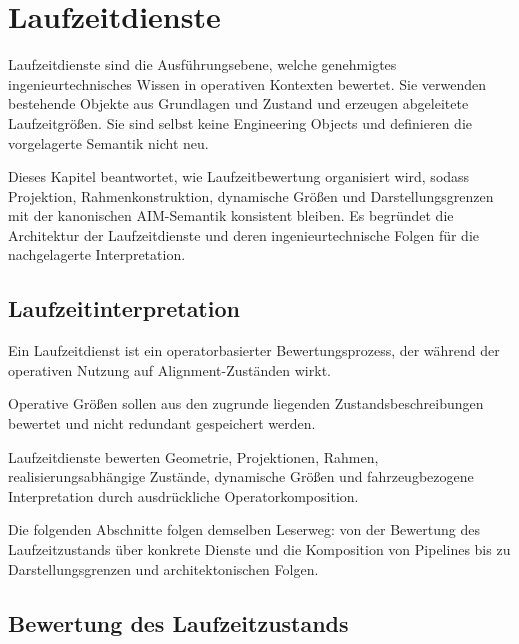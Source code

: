 
\chapter{Laufzeitdienste}
\label{chap:runtime-services}


Laufzeitdienste sind die Ausführungsebene, welche genehmigtes
ingenieurtechnisches Wissen in operativen Kontexten bewertet. Sie verwenden
bestehende Objekte aus Grundlagen und Zustand und erzeugen abgeleitete
Laufzeitgrößen. Sie sind selbst keine Engineering Objects und definieren die
vorgelagerte Semantik nicht neu.

Dieses Kapitel beantwortet, wie Laufzeitbewertung organisiert wird, sodass
Projektion, Rahmenkonstruktion, dynamische Größen und Darstellungsgrenzen mit
der kanonischen AIM-Semantik konsistent bleiben. Es begründet die Architektur
der Laufzeitdienste und deren ingenieurtechnische Folgen für die nachgelagerte
Interpretation.

\section{Laufzeitinterpretation}

\begin{definition}[Laufzeitdienst]
\label{def:runtime-service}
Ein Laufzeitdienst ist ein operatorbasierter Bewertungsprozess, der während
der operativen Nutzung auf Alignment-Zuständen wirkt.
\end{definition}

\begin{principle}
\label{princ:runtime-evaluation}
Operative Größen sollen aus den zugrunde liegenden Zustandsbeschreibungen
bewertet und nicht redundant gespeichert werden.
\end{principle}

Laufzeitdienste bewerten Geometrie, Projektionen, Rahmen,
realisierungsabhängige Zustände, dynamische Größen und fahrzeugbezogene
Interpretation durch ausdrückliche Operatorkomposition.

Die folgenden Abschnitte folgen demselben Leserweg: von der Bewertung des
Laufzeitzustands über konkrete Dienste und die Komposition von Pipelines bis
zu Darstellungsgrenzen und architektonischen Folgen.

\section{Bewertung des Laufzeitzustands}

